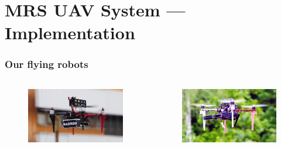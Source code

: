 \documentclass[aspectratio=169,9pt]{beamer}
\begin{document}


\section{MRS UAV System --- Implementation}


\begin{frame}
  \frametitle{Our flying robots}

  \begin{columns}[c]


    \begin{figure}
      \centering
      \includegraphics[width=1.0\textwidth]{./fig/uavs/f330_real.jpg}
    \end{figure}

    \vspace{-1em}

    \begin{figure}
      \centering
      \includegraphics[width=1.0\textwidth]{./fig/uavs/f450_real.jpg}
    \end{figure}


\end{columns}
\end{frame}
\end{document}
